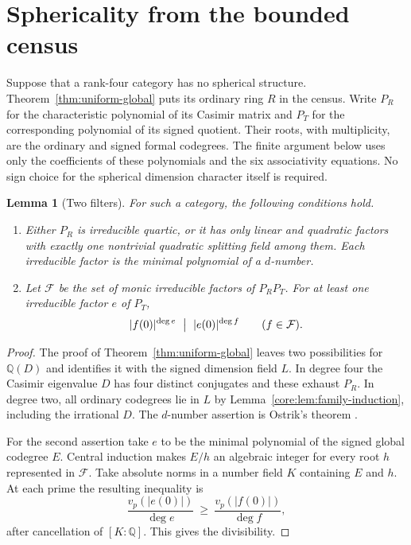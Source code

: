 \documentclass[11pt,a4paper]{article}
\newtheorem{lemma}[theorem]{Lemma}
\theoremstyle{definition}\newtheorem{definition}[theorem]{Definition}
\theoremstyle{remark}\newtheorem{remark}[theorem]{Remark}
\newcommand{\Q}{\mathbb Q}
\numberwithin{equation}{section}
\begin{document}
\section{Sphericality from the bounded census}\label{sec:finite-descent}

Suppose that a rank-four category has no spherical structure.
Theorem~\ref{thm:uniform-global} puts its ordinary ring $R$ in the census.
Write $P_R$ for the characteristic polynomial of its Casimir matrix and
$P_T$ for the corresponding polynomial of its signed quotient. Their roots,
with multiplicity, are the ordinary and signed formal codegrees.
The finite argument below uses only the coefficients of these polynomials
and the six associativity equations. No sign choice for the spherical
dimension character itself is required.

\begin{lemma}[Two filters]\label{lem:descent-filters}
For such a category, the following conditions hold.
\begin{enumerate}
\item Either $P_R$ is irreducible quartic, or it has only linear and
quadratic factors with exactly one nontrivial quadratic splitting field
among them. Each irreducible factor is the minimal polynomial of a
$d$-number.
\item Let $\mathcal F$ be the set of monic irreducible factors of $P_RP_T$.
For at least one irreducible factor $e$ of $P_T$,
\[
 |f(0)|^{\deg e}\ \bigm|\ |e(0)|^{\deg f}\qquad(f\in\mathcal F).
\]
\end{enumerate}
\end{lemma}
\begin{proof}
The proof of Theorem~\ref{thm:uniform-global} leaves two possibilities for
$\Q(D)$ and identifies it with the signed dimension field $L$. In degree
four the Casimir eigenvalue $D$ has four distinct conjugates and these exhaust
$P_R$. In degree two, all ordinary codegrees lie in $L$ by
Lemma~\ref{core:lem:family-induction}, including the irrational $D$.
The $d$-number assertion is Ostrik's theorem \cite{OstrikCodegrees}.

For the second assertion take $e$ to be the minimal polynomial of the signed
global codegree $E$. Central induction makes $E/h$ an algebraic integer for
every root $h$ represented in $\mathcal F$. Take absolute norms in a number
field $K$ containing $E$ and $h$. At each prime the resulting inequality is
\[
 \frac{v_p(|e(0)|)}{\deg e}\ \geq\
 \frac{v_p(|f(0)|)}{\deg f},
\]
after cancellation of $[K:\Q]$. This gives the divisibility.
\end{proof}
\end{document}
